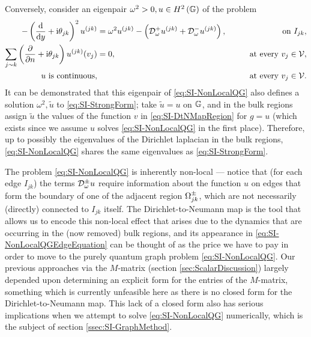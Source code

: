 Conversely, consider an eigenpair $\omega^2>0, u\in H^2\left( \mathbb{G} \right)$ of the problem
\begin{subequations} \label{eq:SI-NonLocalQG}
	\begin{align}
		- \left( \dfrac{\mathrm{d}}{\mathrm{d}y} + \mathrm{i}\theta_{jk} \right)^2u^{(jk)} 
		&= \omega^2 u^{(jk)} - \left(  \mathcal{D}^+_\omega u^{(jk)} + \mathcal{D}^-_\omega u^{(jk)} \right),
		&\qquad\text{on } I_{jk}, \label{eq:SI-NonLocalQGEdgeEquation}  \\
		\sum_{j\sim k} \left( \dfrac{\partial }{\partial n}+\mathrm{i}\theta_{jk} \right) u^{(jk)}(v_j) &= 0,
		&\qquad\text{at every } v_j\in\mathcal{V}, \label{eq:SI-NonLocalQGVertexDeriv} \\
		u \text{ is continuous,} & 
		&\qquad\text{at every } v_j\in\mathcal{V}. \label{eq:SI-NonLocalQGVertexCont}
	\end{align}
\end{subequations}
It can be demonstrated that this eigenpair of \eqref{eq:SI-NonLocalQG} also defines a solution $\omega^2, \tilde{u}$ to \eqref{eq:SI-StrongForm}; take $\tilde{u}=u$ on $\mathbb{G}$, and in the bulk regions assign $\tilde{u}$ the values of the function $v$ in \eqref{eq:SI-DtNMapRegion} for $g=u$ (which exists since we assume $u$ solves \eqref{eq:SI-NonLocalQG} in the first place).
Therefore, up to possibly the eigenvalues of the Dirichlet laplacian in the bulk regions, \eqref{eq:SI-NonLocalQG} shares the same eigenvalues as \eqref{eq:SI-StrongForm}.

The problem \eqref{eq:SI-NonLocalQG} is inherently non-local --- notice that (for each edge $I_{jk}$) the terms $\mathcal{D}^{\pm}_\omega u$ require information about the function $u$ on edges that form the boundary of one of the adjacent region $\Omega_{jk}^{\pm}$, which are not necessarily (directly) connected to $I_{jk}$ itself.
The Dirichlet-to-Neumann map is the tool that allows us to encode this non-local effect that arises due to the dynamics that are occurring in the (now removed) bulk regions, and its appearance in \eqref{eq:SI-NonLocalQGEdgeEquation} can be thought of as the price we have to pay in order to move to the purely quantum graph problem \eqref{eq:SI-NonLocalQG}.
Our previous approaches via the $M$-matrix (section \ref{sec:ScalarDiscussion}) largely depended upon determining an explicit form for the entries of the $M$-matrix, something which is currently unfeasible here as there is no closed form for the Dirichlet-to-Neumann map.
This lack of a closed form also has serious implications when we attempt to solve \eqref{eq:SI-NonLocalQG} numerically, which is the subject of section \ref{ssec:SI-GraphMethod}.


